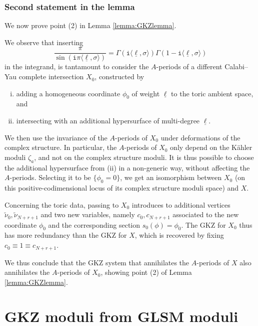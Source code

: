 \documentclass[12pt,a4paper,oneside]{amsart}
\numberwithin{equation}{section}
\theoremstyle{definition}
\theoremstyle{remark}
\newcommand{\ii}{\mathtt{i}}
\begin{document}
\begin{appendix}
\subsubsection{Second statement in the lemma}
We now prove point (2) in Lemma \ref{lemma:GKZlemma}.\par
We observe that inserting 
\begin{equation*}
    \frac{\pi}{ \sin (\ii \pi \langle \underline{\ell}, \sigma \rangle )} = \Gamma \left(\ii \langle \underline{\ell}, \sigma \rangle \right) \Gamma \left( 1-\ii \langle \underline{\ell}, \sigma \rangle \right)
\end{equation*}
in the integrand, is tantamount to consider the $A$-periods of a different Calabi--Yau complete intersection $X_0$, constructed by 
\begin{enumerate}[(i)]
    \item adding a homogeneous coordinate $\phi_{0}$ of weight $\underline{\ell}$ to the toric ambient space, and 
    \item intersecting with an additional hypersurface of multi-degree $\underline{\ell}$.
\end{enumerate}
We then use the invariance of the $A$-periods of $X_0$ under deformations of the complex structure. In particular, the $A$-periods of $X_0$ only depend on the K\"ahler moduli $\zeta_a$, and not on the complex structure moduli. It is thus possible to choose the additional hypersurface from (ii) in a non-generic way, without affecting the $A$-periods. Selecting it to be $\{ \phi_0=0 \}$, we get an isomorphism between $X_0$ (on this positive-codimensional locus of its complex structure moduli space) and $X$.\par
Concerning the toric data, passing to $X_0$ introduces to additional vertices $\tilde{\nu}_0, \tilde{\nu}_{N+r+1}$ and two new variables, namely $c_0,c_{N+r+1}$ associated to the new coordinate $\phi_0$ and the corresponding section $s_0(\phi)=\phi_0$. The GKZ for $X_0$ thus has more redundancy than the GKZ for $X$, which is recovered by fixing $c_0\equiv 1\equiv c_{N+r+1}$.\par
We thus conclude that the GKZ system that annihilates the $A$-periods of $X$ also annihilates the $A$-periods of $X_0$, showing point (2) of Lemma \ref{lemma:GKZlemma}.



\section{GKZ moduli from GLSM moduli}
\label{app:FImoduli}


\end{appendix}
\end{document}
